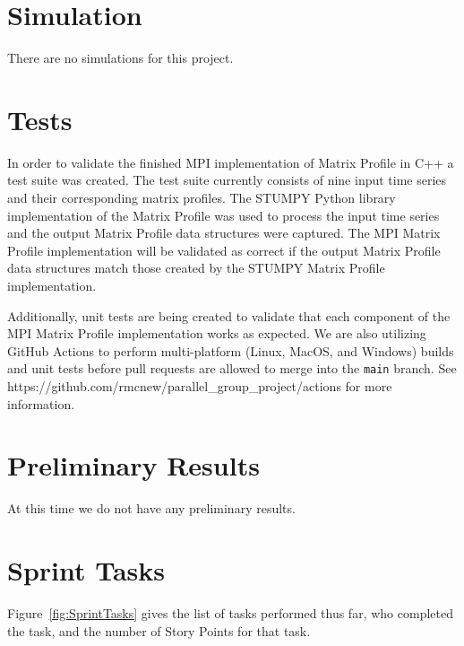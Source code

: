 \documentclass[conference]{IEEEtran}
\begin{document}
\section{Simulation}
There are no simulations for this project.

\section{Tests}
In order to validate the finished MPI implementation of Matrix Profile in C++ a test suite was created.  The test suite currently consists of nine input time series and their corresponding matrix profiles.  The STUMPY\cite{Stumpy} Python library implementation of the Matrix Profile was used to process the input time series and the output Matrix Profile data structures were captured.  The MPI Matrix Profile implementation will be validated as correct if the output Matrix Profile data structures match those created by the STUMPY Matrix Profile implementation. 

Additionally, unit tests are being created to validate that each component of the MPI Matrix Profile implementation works as expected.  We are also utilizing GitHub Actions to perform  multi-platform (Linux, MacOS, and Windows) builds and unit tests before pull requests are allowed to merge into the \texttt{main} branch.  See https://github.com/rmcnew/parallel\_group\_project/actions for more information.


\section{Preliminary Results}
At this time we do not have any preliminary results.  



\section{Sprint Tasks}

Figure~\ref{fig:SprintTasks} gives the list of tasks performed thus far, who completed the task, and the number of Story Points for that task.
\end{document}
